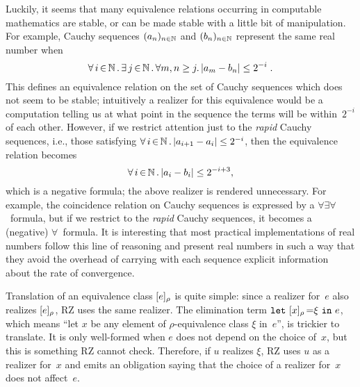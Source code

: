 Luckily, it seems that many equivalence relations occurring in
computable mathematics are stable, or can be made stable with a little
bit of manipulation.
%
\iflong
For example, Cauchy sequences $(a_n)_{n\in\mathbb{N}}$
and $(b_n)_{n\in\mathbb{N}}$ represent the same real number when
%
\begin{equation}
  \label{eq:cauchy}%
  \xall{i}{\NN}{
    \xsome{j}{\NN}{
      \forall m,n \geq j.\,|a_m - b_n| \leq 2^{-i}
    }
  } \;.
\end{equation}
%
This defines an equivalence relation on the set of Cauchy sequences
which does not seem to be stable; intuitively a realizer for this
equivalence would be a computation telling us at what point
in the sequence the terms will be within~$2^{-i}$ of each other.
%
However, if we restrict attention just to the \emph{rapid} Cauchy
sequences, i.e., those satisfying $\forall\, i \,{\in}\, \mathbb{N}\,.\,|a_{i+1} - a_i| \leq
  2^{-i}$, then the equivalence relation becomes
%
\begin{equation*}
  \forall\, i \,{\in}\, \mathbb{N}\,.\,|a_i - b_i| \leq 2^{-i+3},
\end{equation*}
%
which is a negative formula; the above realizer is rendered
unnecessary.
%
\else %
%
For example, the coincidence relation on Cauchy sequences is expressed
by a $\forall\exists\forall$~formula, but if we restrict to the
\emph{rapid} Cauchy sequences, it becomes a (negative)
$\forall$~formula.
%
\fi %
It is interesting that most practical implementations of
real numbers follow this line of reasoning and present real numbers in
such a way that they avoid the overhead of carrying with each sequence
explicit information about the rate of convergence.

Translation of an equivalence class $[e]_{\rho}$ is quite
simple: since a realizer for~$e$ also realizes $[e]_{\rho}$, RZ
uses the same realizer. The elimination term
$\texttt{let}\ [x]_{\rho}\,{=}\xi\ \texttt{in}\ e$, which means ``let $x$ be any element
of $\rho$-equivalence class $\xi$ in~$e$'', is trickier to translate.
It is only well-formed when $e$ does not depend on the choice of~$x$,
but this is something RZ cannot check. Therefore, if $u$ realizes
$\xi$, RZ uses $u$ as a realizer for~$x$ and emits an obligation
saying that the choice of a realizer for~$x$ does not affect~$e$.

